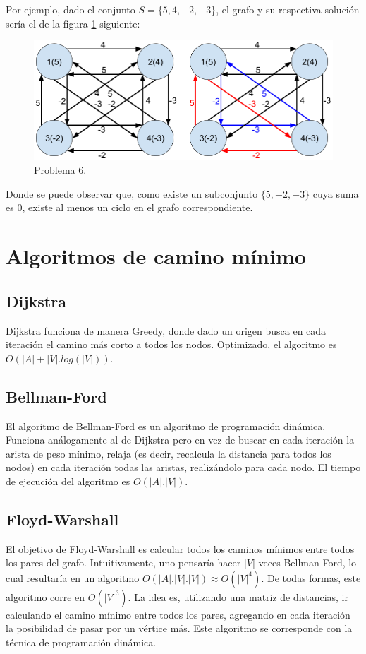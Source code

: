 \documentclass[a4paper,10pt]{article}
\begin{document}
	Por ejemplo, dado el conjunto $S = \{5, 4, -2, -3\}$, el grafo y su respectiva solución sería el de la figura \ref{fig:punto-6} siguiente:

	\begin{figure}[!htb]
		\centering
		\includegraphics[scale=0.4]{images/grafo-6.png}
		\caption{Problema 6.}
		\label{fig:punto-6}
	\end{figure}

	Donde se puede observar que, como existe un subconjunto $\{5, -2, -3\}$ cuya suma es 0, existe al menos un ciclo en el grafo correspondiente.

\section{Algoritmos de camino mínimo}
\subsection{Dijkstra}
	Dijkstra funciona de manera Greedy, donde dado un origen busca en cada iteración el camino más corto a todos los nodos. Optimizado, el algoritmo es $O(|A|+|V|.log(|V|))$.

\subsection{Bellman-Ford}
	El algoritmo de Bellman-Ford es un algoritmo de programación dinámica. Funciona análogamente al de Dijkstra pero en vez de buscar en cada iteración la arista de peso mínimo, relaja (es decir, recalcula la distancia para todos los nodos) en cada iteración todas las aristas, realizándolo para cada nodo. El tiempo de ejecución del algoritmo es $O(|A|.|V|)$.

\subsection{Floyd-Warshall}
	El objetivo de Floyd-Warshall es calcular todos los caminos mínimos entre todos los pares del grafo. Intuitivamente, uno pensaría hacer $|V|$ veces Bellman-Ford, lo cual resultaría en un algoritmo $O(|A|.|V|.|V|) \approx O(|V|^4)$. De todas formas, este algoritmo corre en $O(|V|^3)$. La idea es, utilizando una matriz de distancias, ir calculando el camino mínimo entre todos los pares, agregando en cada iteración la posibilidad de pasar por un vértice más. Este algoritmo se corresponde con la técnica de programación dinámica.
\end{document}
